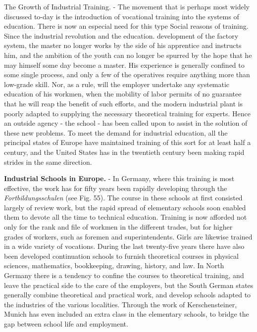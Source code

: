 \documentclass[
]{book}
\begin{document}
The Growth of Industrial Training. - The movement that is perhaps most widely discussed to-day is the introduction of vocational training into the systems of education. There is now an especial need for this type Social reasons of training. Since the industrial revolution and the education. development of the factory system, the master no longer works by the side of his apprentice and instructs him, and the ambition of the youth can no longer be spurred by the hope that he may himself some day become a master. His experience is generally confined to some single process, and only a few of the operatives require anything more than low-grade skill. Nor, as a rule, will the employer undertake any systematic education of his workmen, when the mobility of labor permits of no guarantee that he will reap the benefit of such efforts, and the modern industrial plant is poorly adapted to supplying the necessary theoretical training for experts. Hence an outside agency - the school - has been called upon to assist in the solution of these new problems. To meet the demand for industrial education, all the principal states of Europe have maintained training of this sort for at least half a century, and the United States has in the twentieth century been making rapid strides in the same direction.

\textbf{Industrial Schools in Europe.} - In Germany, where this training is most effective, the work has for fifty years been rapidly developing through the \emph{Fortbildungsschulen} (see Fig. 55). The course in these schools at first consisted largely of review work, but the rapid spread of elementary schools soon enabled them to devote all the time to technical education. Training is now afforded not only for the rank and file of workmen in the different trades, but for higher grades of workers, such as foremen and superintendents. Girls are likewise trained in a wide variety of vocations. During the last twenty-five years there have also been developed continuation schools to furnish theoretical courses in physical sciences, mathematics, bookkeeping, drawing, history, and law. In North Germany there is a tendency to confine the courses to theoretical training, and leave the practical side to the care of the employers, but the South German states generally combine theoretical and practical work, and develop schools adapted to the industries of the various localities. Through the work of Kerschensteiner, Munich has even included an extra class in the elementary schools, to bridge the gap between school life and employment.
\end{document}
